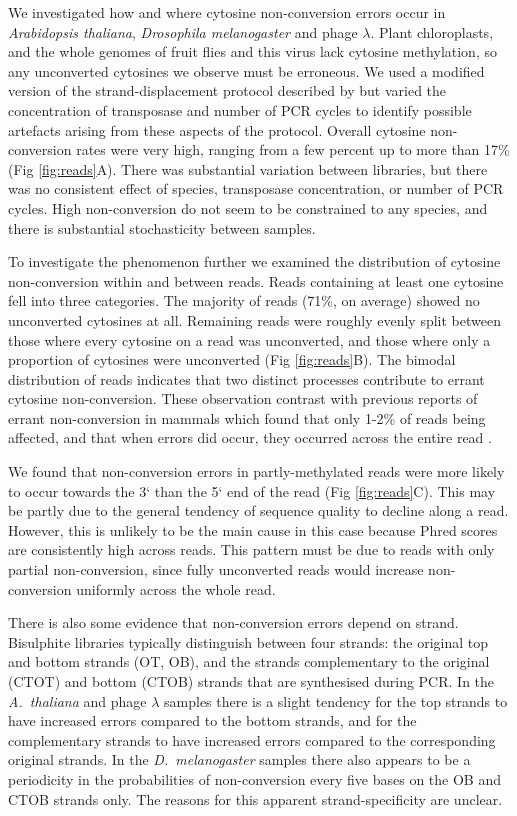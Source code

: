 \documentclass[twocolumn,twoside,lettersize]{article}
\begin{document}
We investigated how and where cytosine non-conversion errors occur in \textit{Arabidopsis thaliana}, \textit{Drosophila melanogaster} and phage $\lambda$.
Plant chloroplasts, and the whole genomes of fruit flies and this virus lack cytosine methylation, so any unconverted cytosines we observe must be erroneous.
We used a modified version of the strand-displacement protocol described by \textcite{weichenhan2019generation} but varied the concentration of transposase and number of PCR cycles to identify possible artefacts arising from these aspects of the protocol.
Overall cytosine non-conversion rates were very high, ranging from a few percent up to more than 17\% (Fig \ref{fig:reads}A).
There was substantial variation between libraries, but there was no consistent effect of species, transposase concentration, or number of PCR cycles.
High non-conversion do not seem to be constrained to any species, and there is substantial stochasticity between samples.

To investigate the phenomenon further we examined the distribution of cytosine non-conversion within and between reads.
Reads containing at least one cytosine fell into three categories.
The majority of reads (71\%, on average) showed no unconverted cytosines at all.
Remaining reads were roughly evenly split between those where every cytosine on a read was unconverted, and those where only a proportion of cytosines were unconverted (Fig \ref{fig:reads}B).
The bimodal distribution of reads indicates that two distinct processes contribute to errant cytosine non-conversion.
These observation contrast with previous reports of errant non-conversion in mammals which found that only 1-2\% of reads being affected, and that when errors did occur, they occurred across the entire read \parencite{lu2015improved, suzuki2018whole}.

We found that non-conversion errors in partly-methylated reads were more likely to occur towards the 3` than the 5` end of the read (Fig \ref{fig:reads}C).
This may be partly due to the general tendency of sequence quality to decline along a read.
However, this is unlikely to be the main cause in this case because Phred scores are consistently high across reads.
This pattern must be due to reads with only partial non-conversion, since fully unconverted reads would increase non-conversion uniformly across the whole read.

There is also some evidence that non-conversion errors depend on strand.
Bisulphite libraries typically distinguish between four strands: the original top and bottom strands (OT, OB), and the strands complementary to the original (CTOT) and bottom (CTOB) strands that are synthesised during PCR.
In the \emph{A.~thaliana} and phage $\lambda$ samples there is a slight tendency for the top strands to have increased errors compared to the bottom strands, and for the complementary strands to have increased errors compared to the corresponding original strands.
In the \emph{D.~melanogaster} samples there also appears to be a periodicity in the probabilities of non-conversion every five bases on the OB and CTOB strands only.
The reasons for this apparent strand-specificity are unclear.
\end{document}
